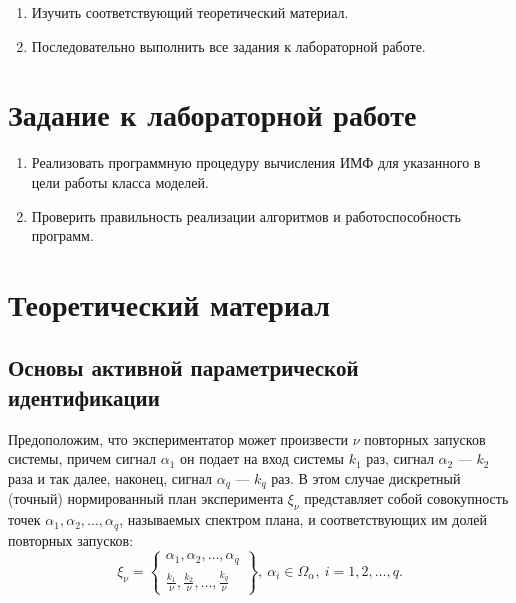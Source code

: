 \documentclass[a4paper,14pt]{extarticle}
\begin{document}
\begin{enumerate}

\item Изучить соответствующий теоретический материал.

\item Последовательно выполнить все задания к лабораторной работе.

\end{enumerate}

\section{Задание к лабораторной работе}

\begin{enumerate}

	\item Реализовать программную процедуру вычисления ИМФ для указанного в цели
		работы класса моделей.

	\item Проверить правильность реализации алгоритмов и работоспособность
		программ.

\end{enumerate}

\section{Теоретический материал}

\subsection{Основы активной параметрической идентификации}

Предоположим, что экспериментатор может произвести $\nu$ повторных запусков
системы, причем сигнал $\alpha_1$ он подает на вход системы $k_1$ раз, сигнал
$\alpha_2$ --- $k_2$ раза и так далее, наконец, сигнал $\alpha_q$ --- $k_q$
раз. В этом случае дискретный (точный) нормированный план эксперимента
$\xi_{\nu}$ представляет собой совокупность точек $\alpha_1, \alpha_2, \ldots,
\alpha_q$, называемых спектром плана, и соответствующих им долей повторных
запусков:
\begin{equation*}
	\xi_{\nu} = \left\{
		\begin{array}{cc} 
			\alpha_1, \alpha_2, \ldots, \alpha_q \\
			\frac{k_1}{\nu}, \frac{k_2}{\nu}, \ldots, \frac{k_q}{\nu}
		\end{array} \right\},\ \alpha_i \in \Omega_{\alpha},\ i = 1, 2, \ldots, q.
\end{equation*}
\end{document}
